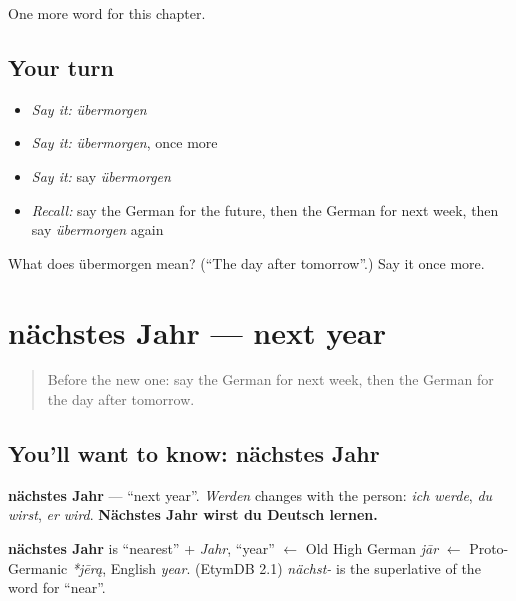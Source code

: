 \begin{grammarlens}[title={What you've built}]
One more word for this chapter.
\end{grammarlens}

\subsection*{Your turn}
\begin{itemize}
\raggedright
  \item \emph{Say it:} \emph{übermorgen}
  \item \emph{Say it:} \emph{übermorgen}, once more
  \item \emph{Say it:} say \emph{übermorgen}
  \item \emph{Recall:} say the German for the future, then the German for next week, then say \emph{übermorgen} again
\end{itemize}

\begin{tcolorbox}[breakable,colback=teal!4,colframe=teal!35!black,title={Before you move on}]
What does übermorgen mean? (\textquotedblleft{}The day after tomorrow\textquotedblright{}.) Say it once more.
\end{tcolorbox}
\section[nächstes Jahr]{nächstes Jahr — next year}

\label{lesson:GE-C142-naechstes-jahr}



\begin{quote}
Before the new one: say the German for next week, then the German for the day after tomorrow.
\end{quote}

\subsection*{You'll want to know: nächstes Jahr}
\textbf{nächstes Jahr} — \textquotedblleft{}next year\textquotedblright{}. \emph{Werden} changes with the person: \emph{ich werde}, \emph{du wirst}, \emph{er wird}. \textbf{Nächstes Jahr wirst du Deutsch lernen.}

\begin{cousinweb}
\textbf{nächstes Jahr} is \textquotedblleft{}nearest\textquotedblright{} + \emph{Jahr}, \textquotedblleft{}year\textquotedblright{} $\leftarrow$ Old High German \emph{jār} $\leftarrow$ Proto-Germanic \emph{*jērą}, English \emph{year}. (EtymDB 2.1) \emph{nächst-} is the superlative of the word for \textquotedblleft{}near\textquotedblright{}.
\end{cousinweb}

